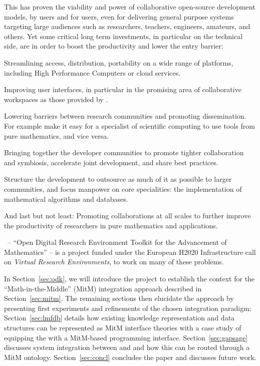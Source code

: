 This has proven the viability and power of collaborative open-source development models,
by users and for users, even for delivering general purpose systems targeting large
audiences such as  researchers, teachers, engineers, amateurs, and others.
Yet some critical long term investments, in particular on the technical side, are in order
to boost the productivity and lower the entry barrier:
\begin{compactitem}
\item Streamlining access, distribution, portability on a wide range of platforms, including
  High Performance Computers or cloud services.
\item Improving user interfaces, in particular in the promising area of collaborative
  workspaces as those provided by \SMC.
\item Lowering barriers between research communities and promoting dissemination. For example
  make it easy for a specialist of scientific computing to use tools from pure
  mathematics, and vice versa.
\item Bringing together the developer communities to promote tighter collaboration and
  symbiosis, accelerate joint development, and share best practices.
\item Structure the development to outsource as much of it as possible to larger communities,
  and focus manpower on core specialities: the implementation of mathematical algorithms
  and databases.
\item And last but not least: Promoting collaborations at all scales to further improve
  the productivity of researchers in pure mathematics and applications.
\end{compactitem}

\ODK\, -- ``Open Digital Research Environment Toolkit for the Advancement
of Mathematics'' \cite{OpenDreamKit:on} -- is a project funded under the
European H2020 Infrastructure call \cite{EINFRA-9} on \emph{Virtual
  Research Environments}, to work on many of these problems.

In Section~\ref{sec:odk}, we will introduce the \ODK project  to establish the context for the
``Math-in-the-Middle'' (MitM) integration approach described in
Section~\ref{sec:mitm}. The remaining sections then elucidate the approach by presenting
first experiments and refinements of the chosen integration paradigm:
Section~\ref{sec:lmfdb} details how existing knowledge representation and data structures
can be represented as MitM interface theories with a case study of equipping the \LMFDB
with a MitM-based programming interface.  Section~\ref{sec:gapsage} discusses system
integration between \GAP and \Sage and how this can be routed through a MitM
ontology. Section~\ref{sec:concl} concludes the paper and discusses future work.


